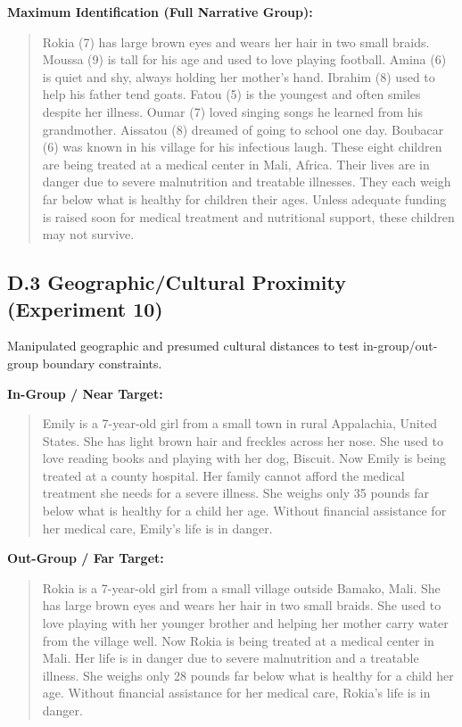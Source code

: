 \textbf{Maximum Identification (Full Narrative Group):}
\begin{quote}
Rokia (7) has large brown eyes and wears her hair in two small braids. Moussa (9) is tall for his age and used to love playing football. Amina (6) is quiet and shy, always holding her mother's hand. Ibrahim (8) used to help his father tend goats. Fatou (5) is the youngest and often smiles despite her illness. Oumar (7) loved singing songs he learned from his grandmother. Aissatou (8) dreamed of going to school one day. Boubacar (6) was known in his village for his infectious laugh. These eight children are being treated at a medical center in Mali, Africa. Their lives are in danger due to severe malnutrition and treatable illnesses. They each weigh far below what is healthy for children their ages. Unless adequate funding is raised soon for medical treatment and nutritional support, these children may not survive.
\end{quote}

\subsection{D.3 Geographic/Cultural Proximity (Experiment 10)}
Manipulated geographic and presumed cultural distances to test in-group/out-group boundary constraints.

\textbf{In-Group / Near Target:}
\begin{quote}
Emily is a 7-year-old girl from a small town in rural Appalachia, United States. She has light brown hair and freckles across her nose. She used to love reading books and playing with her dog, Biscuit. Now Emily is being treated at a county hospital. Her family cannot afford the medical treatment she needs for a severe illness. She weighs only 35 pounds \textemdash far below what is healthy for a child her age. Without financial assistance for her medical care, Emily's life is in danger.
\end{quote}

\textbf{Out-Group / Far Target:}
\begin{quote}
Rokia is a 7-year-old girl from a small village outside Bamako, Mali. She has large brown eyes and wears her hair in two small braids. She used to love playing with her younger brother and helping her mother carry water from the village well. Now Rokia is being treated at a medical center in Mali. Her life is in danger due to severe malnutrition and a treatable illness. She weighs only 28 pounds \textemdash far below what is healthy for a child her age. Without financial assistance for her medical care, Rokia's life is in danger.
\end{quote}
